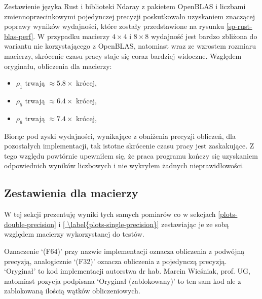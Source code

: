 \documentclass[11pt, a4paper]{article}
\begin{document}
\begin{sloppypar}
    Zestawienie języka Rust i biblioteki Ndaray z pakietem OpenBLAS i liczbami zmiennoprzecinkowymi
    pojedynczej precyzji poskutkowało uzyskaniem znaczącej poprawy wyników wydajności,
    które zostały przedstawione na rysunku \ref{sp-rust-blas-perf}. W przypadku macierzy
    $4\times4$ i $8\times8$ wydajność jest bardzo zbliżona do wariantu nie korzystającego
    z OpenBLAS, natomiast wraz ze wzrostem rozmiaru macierzy, skrócenie czasu pracy staje
    się coraz bardziej widoczne. Względem oryginału, obliczenia dla macierzy:
    \begin{itemize}
      \item $\rho_{1}$ trwają $\approx 5.8\times$ krócej,

      \item $\rho_{5}$ trwają $\approx 6.4\times$ krócej,

      \item $\rho_{6}$ trwają $\approx 7.4\times$ krócej,
    \end{itemize}
    Biorąc pod zyski wydajności, wynikające z obniżenia precyzji obliczeń, dla
    pozostałych implementacji, tak istotne skrócenie czasu pracy jest zaskakujące. Z
    tego względu powtórnie upewniłem się, że praca programu kończy się uzyskaniem odpowiednich
    wyników liczbowych i nie wykryłem żadnych nieprawidłowości.

    \FloatBarrier

    \subsection{Zestawienia dla macierzy}
    W tej sekcji prezentuję wyniki tych samych pomiarów co w sekcjach
    \ref{plots-double-precision} i \ref{ \label{plots-single-precision}} zestawiając je
    ze sobą względem macierzy wykorzystanej do testów.

    Oznaczenie `(F64)' przy nazwie implementacji oznacza obliczenia z podwójną precyzją,
    analogicznie `(F32)' oznacza obliczenia z pojedynczą precyzją. `Oryginał' to kod
    implementacji autorstwa dr hab. Marcin Wieśniak, prof. UG, natomiast pozycja
    podpisana `Oryginał (zablokowany)' to ten sam kod ale z zablokowaną ilością wątków
    obliczeniowych.


\end{sloppypar}
\end{document}

